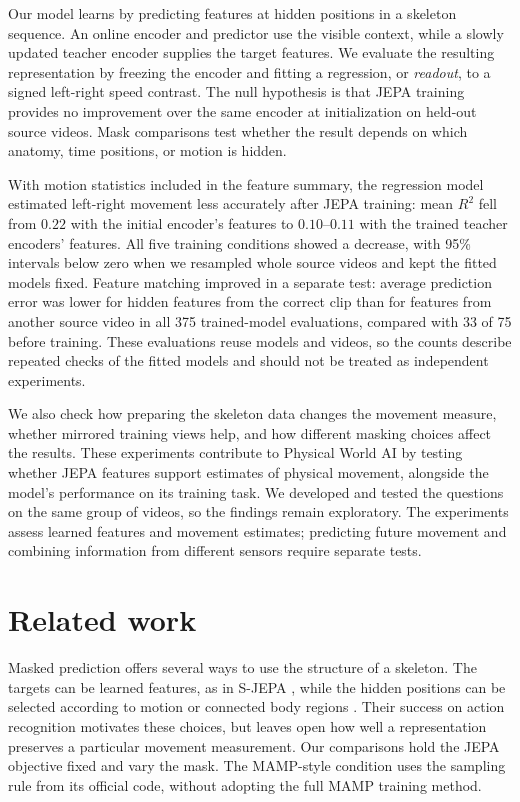 \documentclass{article}
\begin{document}
Our model learns by predicting features at hidden positions in a skeleton sequence. An online encoder and predictor use the visible context, while a slowly updated teacher encoder supplies the target features. We evaluate the resulting representation by freezing the encoder and fitting a regression, or \emph{readout}, to a signed left-right speed contrast. The null hypothesis is that JEPA training provides no improvement over the same encoder at initialization on held-out source videos. Mask comparisons test whether the result depends on which anatomy, time positions, or motion is hidden.

With motion statistics included in the feature summary, the regression model estimated left-right movement less accurately after JEPA training: mean \(R^2\) fell from \(0.22\) with the initial encoder's features to \(0.10\)--\(0.11\) with the trained teacher encoders' features. All five training conditions showed a decrease, with 95\% intervals below zero when we resampled whole source videos and kept the fitted models fixed. Feature matching improved in a separate test: average prediction error was lower for hidden features from the correct clip than for features from another source video in all 375 trained-model evaluations, compared with 33 of 75 before training. These evaluations reuse models and videos, so the counts describe repeated checks of the fitted models and should not be treated as independent experiments.

We also check how preparing the skeleton data changes the movement measure, whether mirrored training views help, and how different masking choices affect the results. These experiments contribute to Physical World AI by testing whether JEPA features support estimates of physical movement, alongside the model's performance on its training task. We developed and tested the questions on the same group of videos, so the findings remain exploratory. The experiments assess learned features and movement estimates; predicting future movement and combining information from different sensors require separate tests.

\section{Related work}\label{related-work}

Masked prediction offers several ways to use the structure of a skeleton. The targets can be learned features, as in S-JEPA \citep{ref05}, while the hidden positions can be selected according to motion \citep{ref06} or connected body regions \citep{ref07}. Their success on action recognition motivates these choices, but leaves open how well a representation preserves a particular movement measurement. Our comparisons hold the JEPA objective fixed and vary the mask. The MAMP-style condition uses the sampling rule from its official code, without adopting the full MAMP training method.
\end{document}
